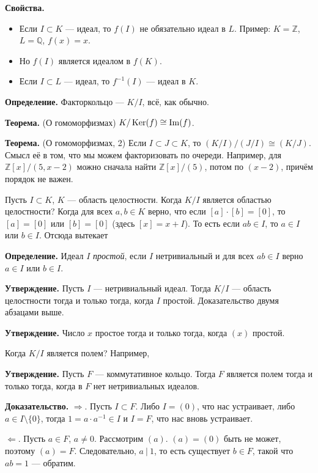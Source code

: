 \textbf{Свойства.}
\begin{itemize}
    \item Если $I \subset K$ --- идеал, то $f(I)$ не обязательно идеал в $L$. Пример: $K = \mathbb Z$, $L = \mathbb Q$, $f(x) = x$.
    \item Но $f(I)$ является идеалом в $f(K)$.
    \item Если $I \subset L$ --- идеал, то $f^{-1}(I)$ --- идеал в $K$.
\end{itemize}

\textbf{Определение.} Факторкольцо --- $K/I$, всё, как обычно.

\textbf{Теорема.} (О гомоморфизмах) $K / \operatorname{Ker}(f) \cong \operatorname{Im}(f)$.

\textbf{Теорема.} (О гомоморфизмах, 2) Если $I \subset J \subset K$, то $(K / I) / (J / I) \cong (K / J)$.
Смысл её в том, что мы можем факторизовать по очереди.
Например, для $\mathbb Z[x] / (5, x - 2)$ можно сначала найти $\mathbb Z[x] / (5)$, потом по $(x - 2)$, причём порядок не важен.

Пусть $I \subset K$, $K$ --- область целостности.
Когда $K/I$ является областью целостности?
Когда для всех $a, b \in K$ верно, что если $[a] \cdot [b] = [0]$, то $[a] = [0]$ или $[b] = [0]$ (здесь $[x] = x + I$).
То есть если $ab \in I$, то $a \in I$ или $b \in I$.
Отсюда вытекает

\textbf{Определение.} Идеал $I$ \textit{простой}, если $I$ нетривиальный и для всех $ab \in I$ верно $a \in I$ или $b \in I$.

\textbf{Утверждение.} Пусть $I$ --- нетривиальный идеал.
Тогда $K / I$ --- область целостности тогда и только тогда, когда $I$ простой.
Доказательство двумя абзацами выше.

\textbf{Утверждение.} Число $x$ простое тогда и только тогда, когда $(x)$ простой.

Когда $K/I$ является полем? Например,

\textbf{Утверждение.} Пусть $F$ --- коммутативное кольцо. Тогда $F$ является полем тогда и только тогда, когда в $F$ нет нетривиальных идеалов.

\textbf{Доказательство.} $\Rightarrow$. Пусть $I \subset F$.
Либо $I = (0)$, что нас устраивает, либо $a \in I \setminus \{0\}$, тогда $1 = a \cdot a^{-1} \in I$ и $I = F$, что нас вновь устраивает.

$\Leftarrow$. Пусть $a \in F$, $a \ne 0$.
Рассмотрим $(a)$. $(a) = (0)$ быть не может, поэтому $(a) = F$.
Следовательно, $a~|~1$, то есть существует $b \in F$, такой что $ab = 1$ --- обратим.

